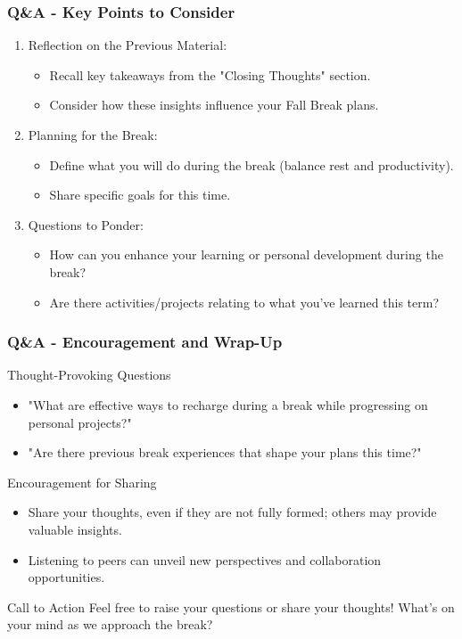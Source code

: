 \documentclass[aspectratio=169]{beamer}
\begin{document}
\begin{frame}[fragile]
    \frametitle{Q\&A - Key Points to Consider}
    \begin{enumerate}
        \item Reflection on the Previous Material:
            \begin{itemize}
                \item Recall key takeaways from the "Closing Thoughts" section.
                \item Consider how these insights influence your Fall Break plans.
            \end{itemize}
        \item Planning for the Break:
            \begin{itemize}
                \item Define what you will do during the break (balance rest and productivity).
                \item Share specific goals for this time.
            \end{itemize}
        \item Questions to Ponder:
            \begin{itemize}
                \item How can you enhance your learning or personal development during the break?
                \item Are there activities/projects relating to what you've learned this term?
            \end{itemize}
    \end{enumerate}
\end{frame}

\begin{frame}[fragile]
    \frametitle{Q\&A - Encouragement and Wrap-Up}
    \begin{block}{Thought-Provoking Questions}
        \begin{itemize}
            \item "What are effective ways to recharge during a break while progressing on personal projects?"
            \item "Are there previous break experiences that shape your plans this time?"
        \end{itemize}
    \end{block}
    \begin{block}{Encouragement for Sharing}
        \begin{itemize}
            \item Share your thoughts, even if they are not fully formed; others may provide valuable insights.
            \item Listening to peers can unveil new perspectives and collaboration opportunities.
        \end{itemize}
    \end{block}
    \begin{block}{Call to Action}
        Feel free to raise your questions or share your thoughts! What’s on your mind as we approach the break?
    \end{block}
\end{frame}
\end{document}
